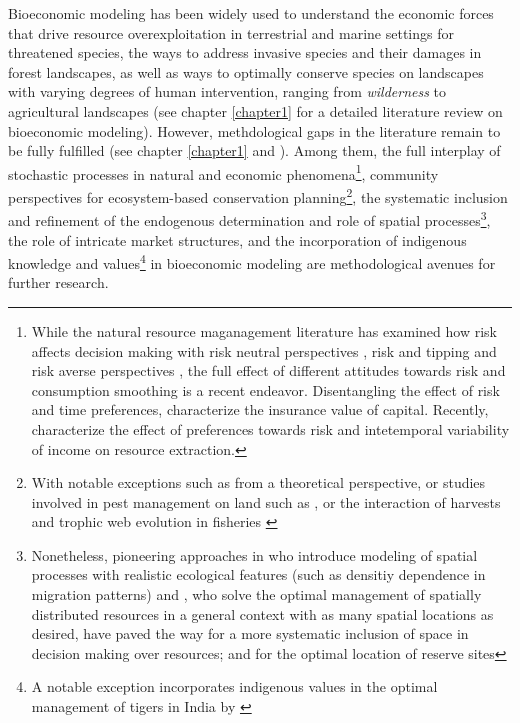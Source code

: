 Bioeconomic modeling has been widely used to understand the economic forces that drive resource overexploitation in terrestrial and marine settings for threatened species, the ways to address invasive species and their damages in forest landscapes, as well as ways to optimally conserve species on landscapes with varying degrees of human intervention, ranging from \textit{wilderness} to agricultural landscapes (see chapter \ref{chapter1} for a detailed literature review on bioeconomic modeling).
However, methdological gaps in the literature remain to be fully fulfilled (see chapter \ref{chapter1} and \cite{Drechsler20200}). Among them, the full interplay of stochastic processes in natural and economic phenomena\footnote{While the natural resource maganagement literature has examined how risk affects decision making with risk neutral perspectives \citep{reed_1979_optimal, costello_optimal_2008}, risk and tipping \citep{costello_renewable_2019} and risk averse perspectives \citep{McGoughPlantingaCostello+2009,kapaun_does_2013,TAHVONEN2018659}, the full effect of different attitudes towards risk and consumption smoothing is a recent endeavor. Disentangling the effect of risk and time preferences, \cite{quaas_2019_insurance, AugeraudVeron2019} characterize the insurance value of capital. Recently, \cite{KELSALL2023102855} characterize the effect of preferences towards risk and intetemporal variability of income on resource extraction.}, community perspectives for ecosystem-based conservation planning\footnote{With notable exceptions such as \cite{Brock2003} from a theoretical perspective, or studies involved in pest management on land such as \cite{Higgins1997_dynamic}, or the interaction of harvests and trophic web evolution in fisheries \citep{glaum_integrating_2020}}, the systematic inclusion and refinement of the endogenous determination and role of spatial processes\footnote{Nonetheless, pioneering approaches in \cite{sanchirico_bioeconomics_1999, SANCHIRICO200523, costello_optimal_2008} who introduce modeling of spatial processes with realistic ecological features (such as densitiy dependence in migration patterns) and \cite{costello_optimal_2008, costello_private_2017}, who solve the optimal management of spatially distributed resources in a general context with as many spatial locations as desired, have paved the way for a more systematic inclusion of space in decision making over resources; and \cite{Costello2004} for the optimal location of reserve sites}, the role of intricate market structures, and the incorporation of indigenous knowledge and values\footnote{A notable exception incorporates indigenous values in the optimal management of tigers in India by \cite{Lopes2020}} in bioeconomic modeling \citep{IPBES2016} are methodological avenues for further research.


